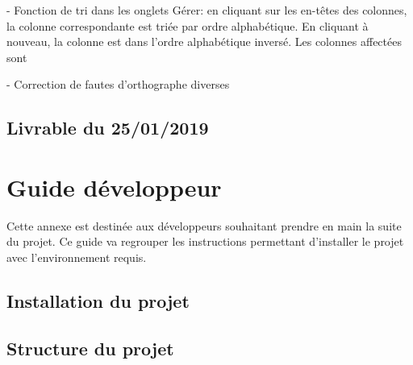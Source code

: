 \documentclass[noposter]{polytech/polytech}
\begin{document}
- Fonction de tri dans les onglets Gérer: en cliquant sur les en-têtes des colonnes, la colonne correspondante est triée par ordre alphabétique. En cliquant à nouveau, la colonne est dans l'ordre alphabétique inversé. Les colonnes affectées sont 

- Correction de fautes d'orthographe diverses

\section{Livrable du 25/01/2019}


\chapter{Guide développeur}


Cette annexe est destinée aux développeurs souhaitant prendre en main la suite du projet. Ce guide va regrouper les instructions permettant d'installer le projet avec l'environnement requis. 


\section{Installation du projet}


\section{Structure du projet}
\end{document}
